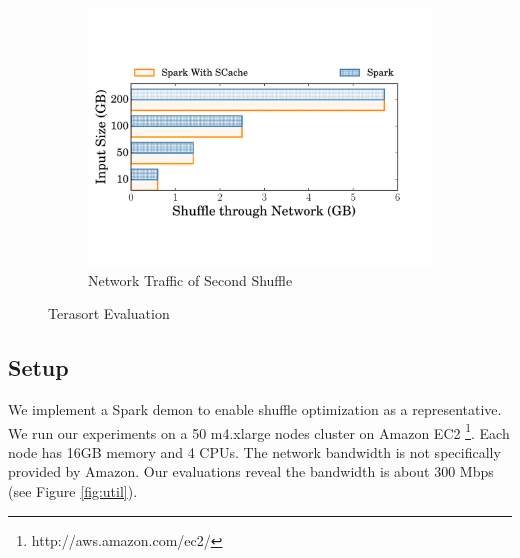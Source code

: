 \begin{figure}
\begin{minipage}[t]{.32\linewidth}
\begin{subfigure}{\linewidth}
			\begin{minipage}{\linewidth}
				\includegraphics[width=\linewidth]{fig/tera_shuffle}
				\caption{Network Traffic of Second Shuffle}
				\label{fig:terashuffle}
			\end{minipage}
		\end{subfigure}
		\caption{Terasort Evaluation}
	\end{minipage}
\end{figure}

\subsection{Setup}\label{stepup}
We implement a Spark demon to enable shuffle optimization as a representative.
We run our experiments on a 50 m4.xlarge nodes cluster on Amazon EC2 \footnote{http://aws.amazon.com/ec2/}. Each node has 16GB memory and 4 CPUs. The network bandwidth is not specifically provided by Amazon. Our evaluations reveal the bandwidth is about 300 Mbps (see Figure \ref{fig:util}).


